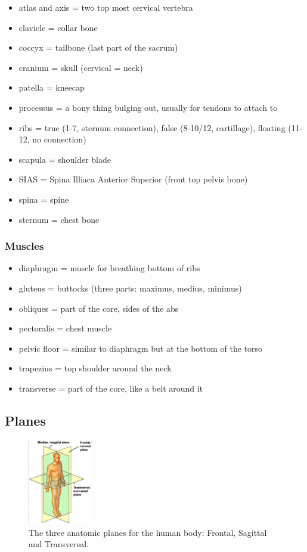 \begin{itemize}
    \setlength\itemsep{0em}
    \item atlas and axis = two top most cervical vertebra
    \item clavicle = collar bone
    \item coccyx = tailbone (last part of the sacrum)
    \item cranium = skull (cervical = neck)
    \item patella = kneecap
    \item processus = a bony thing bulging out, usually for tendons to attach to
    \item ribs = true (1-7, sternum connection), false (8-10/12, cartillage), floating (11-12, no connection)
    \item scapula = shoulder blade
    \item SIAS = Spina Illiaca Anterior Superior (front top pelvis bone)
    \item spina = spine
    \item sternum = chest bone
\end{itemize}

\subsubsection{Muscles}

\begin{itemize}
    \setlength\itemsep{0em}
    \item diaphragm = muscle for breathing bottom of ribs
    \item gluteus = buttocks (three parts: maximus, medius, minimus)
    \item obliques = part of the core, sides of the abs
    \item pectoralis = chest muscle
    \item pelvic floor = similar to diaphragm but at the bottom of the torso
    \item trapezius = top shoulder around the neck
    \item transverse = part of the core, like a belt around it
\end{itemize}

\subsection{Planes}\label{subsec:planes}

\begin{figure}
    \centering
    \includegraphics[width=0.25\textwidth]{images/anatomy_planes}
    \caption{The three anatomic planes for the human body: Frontal, Sagittal and Transversal.}
\end{figure}

